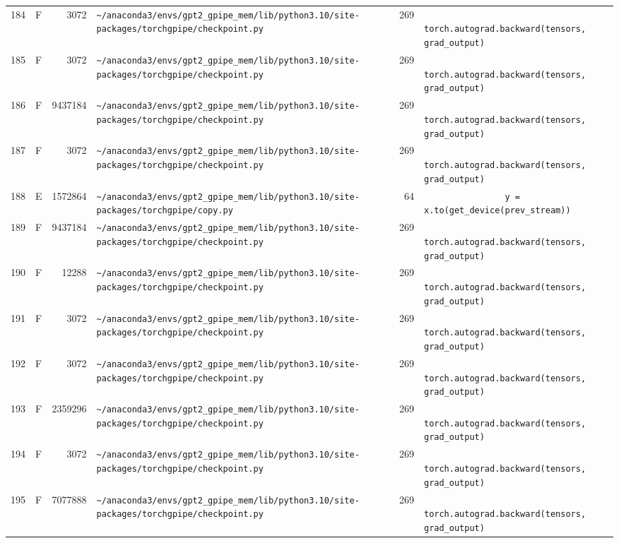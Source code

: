\documentclass{article}
\begin{document}
\begin{longtable}{r l r p{6.5cm} r p{7.0cm}}
184 & F & 3072 & \lstinline|~/anaconda3/envs/gpt2_gpipe_mem/lib/python3.10/site-packages/torchgpipe/checkpoint.py| & 269 & \lstinline|            torch.autograd.backward(tensors, grad_output)| \\
185 & F & 3072 & \lstinline|~/anaconda3/envs/gpt2_gpipe_mem/lib/python3.10/site-packages/torchgpipe/checkpoint.py| & 269 & \lstinline|            torch.autograd.backward(tensors, grad_output)| \\
186 & F & 9437184 & \lstinline|~/anaconda3/envs/gpt2_gpipe_mem/lib/python3.10/site-packages/torchgpipe/checkpoint.py| & 269 & \lstinline|            torch.autograd.backward(tensors, grad_output)| \\
187 & F & 3072 & \lstinline|~/anaconda3/envs/gpt2_gpipe_mem/lib/python3.10/site-packages/torchgpipe/checkpoint.py| & 269 & \lstinline|            torch.autograd.backward(tensors, grad_output)| \\
188 & E & 1572864 & \lstinline|~/anaconda3/envs/gpt2_gpipe_mem/lib/python3.10/site-packages/torchgpipe/copy.py| & 64 & \lstinline|                y = x.to(get_device(prev_stream))| \\
189 & F & 9437184 & \lstinline|~/anaconda3/envs/gpt2_gpipe_mem/lib/python3.10/site-packages/torchgpipe/checkpoint.py| & 269 & \lstinline|            torch.autograd.backward(tensors, grad_output)| \\
190 & F & 12288 & \lstinline|~/anaconda3/envs/gpt2_gpipe_mem/lib/python3.10/site-packages/torchgpipe/checkpoint.py| & 269 & \lstinline|            torch.autograd.backward(tensors, grad_output)| \\
191 & F & 3072 & \lstinline|~/anaconda3/envs/gpt2_gpipe_mem/lib/python3.10/site-packages/torchgpipe/checkpoint.py| & 269 & \lstinline|            torch.autograd.backward(tensors, grad_output)| \\
192 & F & 3072 & \lstinline|~/anaconda3/envs/gpt2_gpipe_mem/lib/python3.10/site-packages/torchgpipe/checkpoint.py| & 269 & \lstinline|            torch.autograd.backward(tensors, grad_output)| \\
193 & F & 2359296 & \lstinline|~/anaconda3/envs/gpt2_gpipe_mem/lib/python3.10/site-packages/torchgpipe/checkpoint.py| & 269 & \lstinline|            torch.autograd.backward(tensors, grad_output)| \\
194 & F & 3072 & \lstinline|~/anaconda3/envs/gpt2_gpipe_mem/lib/python3.10/site-packages/torchgpipe/checkpoint.py| & 269 & \lstinline|            torch.autograd.backward(tensors, grad_output)| \\
195 & F & 7077888 & \lstinline|~/anaconda3/envs/gpt2_gpipe_mem/lib/python3.10/site-packages/torchgpipe/checkpoint.py| & 269 & \lstinline|            torch.autograd.backward(tensors, grad_output)| \\

\end{longtable}
\end{document}
